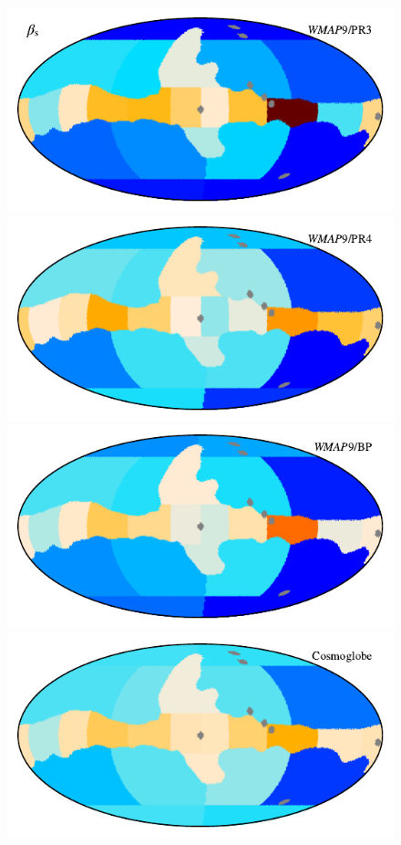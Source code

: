 \documentclass[twocolumn]{../../common/aa}
\begin{document}
\begin{figure}
        \centering
	\includegraphics{figures/TT_map_W9PR3_K30.pdf}\vspace{-0.25cm}\\
	\includegraphics{figures/TT_map_W9PR4_K30.pdf}\vspace{-0.25cm}\\
	\includegraphics{figures/TT_map_W9BP_K30.pdf}\vspace{-0.25cm}\\
	\includegraphics{figures/TT_map_CG_K30.pdf}\vspace{-0.25cm}\\

\end{figure}
\end{document}
